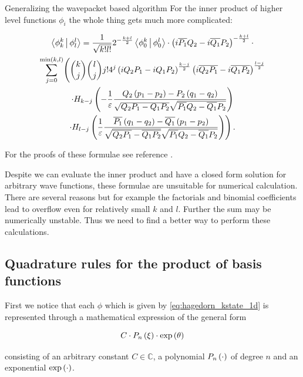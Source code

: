 \begin{chapter}{Generalizing the wavepacket based algorithm}
For the inner product of higher level functions $\phi_i$ the whole thing gets much
more complicated:

\begin{multline}
  \Braket{ \phi_k^k | \phi_l^l } =
  \frac{1}{\sqrt{k!l!}} 2^{-\frac{k+l}{2}} \Braket{ \phi_0^k | \phi_0^l } \cdot
  \left(i \overline{ P_1} Q_2 - i \overline{Q_1} P_2\right)^{-\frac{k+l}{2}} \cdot \\
  \sum_{j=0}^{\min\left(k,l\right)}
    \Biggl(
      \binom{k}{j} \binom{l}{j} j! 4^j
      \left(i Q_2  P_1 - i Q_1  P_2\right)^{\frac{k-j}{2}}
      \left(i \overline{Q_2 P_1} - i\overline{Q_1 P_2}\right)^{\frac{l-j}{2}}
      \\
      \cdot H_{k-j}\left(-\frac{1}{\varepsilon}
                    \frac{Q_2\left(p_1-p_2\right)-P_2\left(q_1-q_2\right)}
                         {\sqrt{Q_2 P_1 - Q_1 P_2}\sqrt{\overline{P_1}Q_2-\overline{Q_1} P_2}}\right)
      \\
      \cdot H_{l-j}\left(\frac{1}{\varepsilon}
                   \frac{\overline{ P_1}\left(q_1-q_2\right)-\overline{Q_1}\left(p_1-p_2\right)}
                        {\sqrt{\overline{Q_2 P_1}-\overline{Q_1 P_2}}\sqrt{\overline{ P_1}Q_2-\overline{Q_1} P_2}}\right)
    \Biggr) \,.
\end{multline}

For the proofs of these formulae see reference \cite{H_R_quantization_rules}.

Despite we can evaluate the inner product and have a closed form solution for arbitrary
wave functions, these formulae are unsuitable for numerical calculation. There are
several reasons but for example the factorials and binomial coefficients lead to
overflow even for relatively small $k$ and $l$. Further the sum may be numerically
unstable. Thus we need to find a better way to perform these calculations.

\subsection{Quadrature rules for the product of basis functions}

First we notice that each $\phi$ which is given by \eqref{eq:hagedorn_kstate_1d}
is represented through a mathematical expression of the general form

\begin{equation} \label{eq:expression_format}
  C \cdot P_n\left( \xi \right) \cdot \exp \left( \theta \right)
\end{equation}

consisting of an arbitrary constant $C \in \mathbb{C}$, a polynomial $P_n\left( \cdot \right)$
of degree $n$ and an exponential $\exp\left( \cdot \right)$.


\end{chapter}
